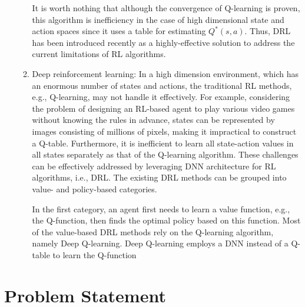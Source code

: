\documentclass[letterpaper%
, twoside%
, 12pt%
,thesepararticles%
, english%
,creativecommons,hyperref, withAlgo2e%
]{thETS}
\begin{document}
\begin{enumerate}
\begin{enumerate}
{It is worth nothing that although the convergence of Q-learning is proven, this algorithm is inefficiency in the case of high dimensional state and action spaces since it uses a table for estimating $\displaystyle Q^{*}( s,a)$. Thus, DRL has been introduced recently as a highly-effective solution to address the current limitations of RL algorithms.
}	     	
\item{
Deep reinforcement learning: In a high dimension environment, which has an enormous number of states and actions, the traditional RL methods, e.g., Q-learning, may not handle it effectively. For example, considering the problem of designing an RL-based agent to play various video games without knowing the rules in advance, states can be represented by images consisting of millions of pixels, making it impractical to construct a Q-table. Furthermore, it is inefficient to learn all state-action values in all states separately as that of the Q-learning algorithm. These challenges can be effectively addressed by leveraging DNN architecture for RL algorithms, i.e., DRL. The existing DRL methods can be grouped into value- and policy-based categories.

In the first category, an agent first needs to learn a value function, e.g., the Q-function, then finds the optimal policy based on this function. Most of the value-based DRL methods rely on the Q-learning algorithm, namely Deep Q-learning. Deep Q-learning employs a DNN instead of a Q-table to learn the Q-function

}
	\end{enumerate} 
\end{enumerate}








\section{Problem Statement}
\end{document}
